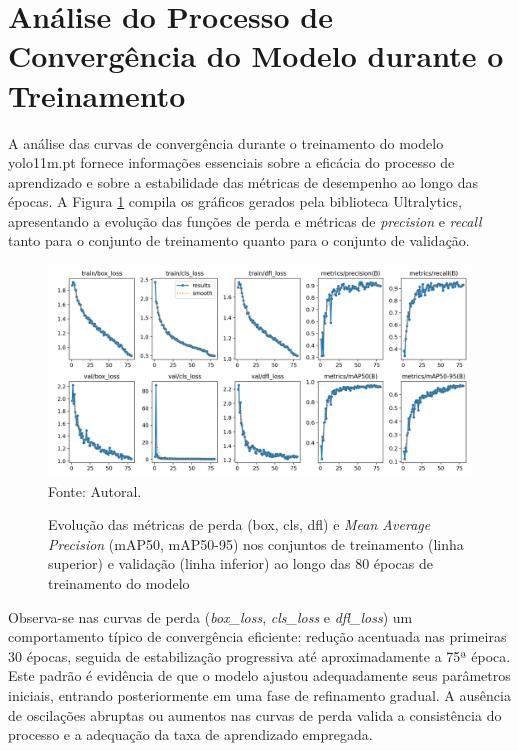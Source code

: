 \section{Análise do Processo de Convergência do Modelo durante o Treinamento}

A análise das curvas de convergência durante o treinamento do modelo yolo11m.pt fornece informações essenciais sobre a eficácia do processo de aprendizado e sobre a estabilidade das métricas de desempenho ao longo das épocas. A Figura \ref{fg-results} compila os gráficos gerados pela biblioteca Ultralytics, apresentando a evolução das funções de perda e métricas de \textit{precision} e \textit{recall} tanto para o conjunto de treinamento quanto para o conjunto de validação.

\begin{figure}[htbp]
  \centering
  \caption{Evolução das métricas de perda (box, cls, dfl) e \textit{Mean Average Precision} (mAP50, mAP50-95) nos conjuntos de treinamento (linha superior) e validação (linha inferior) ao longo das 80 épocas de treinamento do modelo}
  \includegraphics[width=1\textwidth]{Figuras/results.png}
  \\
  Fonte: Autoral.
  \label{fg-results}
\end{figure}

Observa-se nas curvas de perda (\textit{box\_loss}, \textit{cls\_loss} e \textit{dfl\_loss}) um comportamento típico de convergência eficiente: redução acentuada nas primeiras 30 épocas, seguida de estabilização progressiva até aproximadamente a 75ª época. Este padrão é evidência de que o modelo ajustou adequadamente seus parâmetros iniciais, entrando posteriormente em uma fase de refinamento gradual. A ausência de oscilações abruptas ou aumentos nas curvas de perda valida a consistência do processo e a adequação da taxa de aprendizado empregada.

